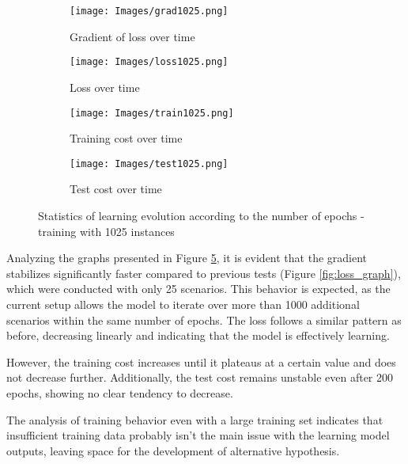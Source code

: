 \begin{figure}[H]
\centering
\begin{subfigure}[b]{0.3\textwidth}
    \texttt{[image: Images/grad1025.png]}
    \caption{Gradient of loss over time}
    \label{fig:grad_loss_1025}
\end{subfigure}
\hspace{0.01\textwidth}
\begin{subfigure}[b]{0.3\textwidth}
    \texttt{[image: Images/loss1025.png]}
    \caption{Loss over time}
    \label{fig:loss_1025}
\end{subfigure}

\vspace{0.5cm}

\begin{subfigure}[b]{0.3\textwidth}
    \texttt{[image: Images/train1025.png]}
    \caption{Training cost over time}
    \label{fig:training_cost_1025}
\end{subfigure}
\hspace{0.01\textwidth}
\begin{subfigure}[b]{0.3\textwidth}
    \texttt{[image: Images/test1025.png]}
    \caption{Test cost over time}
    \label{fig:test_cost_1025}
\end{subfigure}
    
\caption{Statistics of learning evolution according to the number of epochs - training with 1025 instances}
\label{fig:loss_graph_1025}
\end{figure}

Analyzing the graphs presented in Figure \ref{fig:loss_graph_1025}, it is evident that the gradient stabilizes significantly faster compared to previous tests (Figure \ref{fig:loss_graph}), which were conducted with only 25 scenarios. This behavior is expected, as the current setup allows the model to iterate over more than 1000 additional scenarios within the same number of epochs. The loss follows a similar pattern as before, decreasing linearly and indicating that the model is effectively learning.

However, the training cost increases until it plateaus at a certain value and does not decrease further. Additionally, the test cost remains unstable even after 200 epochs, showing no clear tendency to decrease.

The analysis of training behavior even with a large training set indicates that insufficient training data probably isn't the main issue with the learning model outputs, leaving space for the development of alternative hypothesis.

